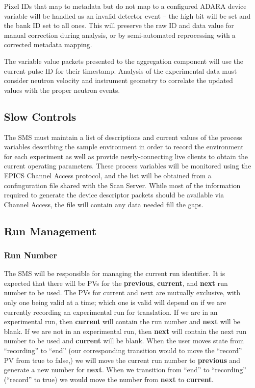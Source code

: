 Pixel IDs that map to metadata but do not map to a configured ADARA device
variable will be handled as an invalid detector event -- the high bit will
be set and the bank ID set to all ones. This will preserve the raw ID and
data value for manual correction during analysis, or by semi-automated
reprocessing with a corrected metadata mapping.

The variable value packets presented to the aggregation component will
use the current pulse ID for their timestamp. Analysis of the experimental
data must consider neutron velocity and instrument geometry to correlate the
updated values with the proper neutron events.


\subsection{Slow Controls}

The SMS must maintain a list of descriptions and current values of the process
variables describing the sample environment in order to record the environment
for each experiment as well as provide newly-connecting live clients to obtain
the current operating parameters. These process variables will be monitored
using the EPICS Channel Access protocol, and the list will be obtained from a
confinguration file shared with the Scan Server. While most of the information
required to generate the device descriptor packets should be available
via Channel Access, the file will contain any data needed fill the gaps.


\subsection{Run Management}

\subsubsection{Run Number}

The SMS will be responsible for managing the current run identifier. It is
expected that there will be PVs for the {\bf previous}, {\bf current}, and {\bf
next} run number to be used. The PVs for current and next are mutually
exclusive, with only one being valid at a time; which one is valid will depend
on if we are currently recording an experimental run for translation. If we are
in an experimental run, then {\bf current} will contain the run number and {\bf
next} will be blank. If we are not in an experimental run, then {\bf next} will
contain the next run number to be used and {\bf current} will be blank. When
the user moves state from ``recording'' to ``end'' (our corresponding
transition would to move the ``record'' PV from true to false,) we will move
the current run number to {\bf previous} and generate a new number for {\bf
next}. When we transition from ``end'' to ``recording'' (``record'' to true) we
would move the number from {\bf next} to {\bf current}.

